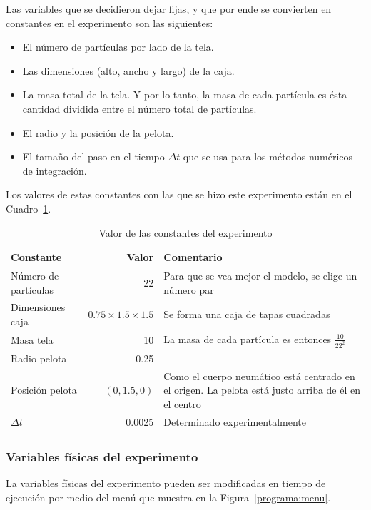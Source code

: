 Las variables que se decidieron dejar fijas, y que por ende se convierten en constantes en el experimento son las siguientes:

\begin{itemize}
 \item El número de partículas por lado de la tela.
 \item Las dimensiones (alto, ancho y largo) de la caja.
 \item La masa total de la tela. Y por lo tanto, la masa de cada partícula es ésta cantidad dividida entre el número total de partículas.
 \item El radio y la posición de la pelota.
 \item El tamaño del paso en el tiempo $\Delta t$ que se usa para los métodos numéricos de integración.
\end{itemize}

Los valores de estas constantes con las que se hizo este experimento están en el Cuadro~\ref{valores:constantes}.
\begin{table}
\begin{center}
\begin{tabular} {@{}lrp{8cm}@{}}
\toprule
Constante & Valor & Comentario\\ 
\midrule
 Número de partículas & 22 & Para que se vea mejor el modelo, se elige un número par\\
 Dimensiones caja & $0.75 \times 1.5 \times 1.5$ & Se forma una caja de tapas cuadradas \\
 Masa tela & 10 & La masa de cada partícula es entonces $\frac{10}{22^{2}}$ \\
 Radio pelota & 0.25 &  \\
 Posición pelota & $(0, 1.5, 0)$& Como el cuerpo neumático está centrado en el origen. La pelota está justo arriba de él en el centro\\
 $\Delta t$ & 0.0025 & Determinado experimentalmente \\
\bottomrule
\end{tabular}
\caption[Valores de las constantes durante el experimento]{Valor de las constantes del experimento}
\label{valores:constantes}
\end{center}
\end{table}

\subsubsection{Variables físicas del experimento}
La variables físicas del experimento pueden ser modificadas en tiempo de ejecución por medio del menú que muestra en la Figura~\ref{programa:menu}.

